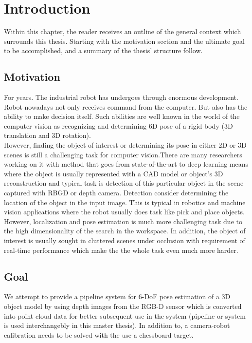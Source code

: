 \chapter{Introduction}
\label{chap:intro}

Within this chapter, the reader receives an outline of the general context which surrounds this thesis. Starting with the motivation section and the ultimate goal to be accomplished, and a summary of the thesis' structure follow. 

\section{Motivation}
For years. The industrial robot has undergoes through enormous development. Robot nowadays not only receives command from the computer. But also has the ability to make decision itself. Such abilities are well known in the world of the computer vision as recognizing and determining 6D pose of a rigid body (3D translation and 3D rotation). \\
However, finding the object of interest or determining its pose in either 2D or 3D scenes is still a challenging task for computer vision.There are many researchers working on it with method that goes from state-of-the-art to deep learning means where the object is usually represented with a CAD model or object's 3D reconstruction and typical task is detection of this particular object in the scene captured with RBGD or depth camera. Detection consider determining the location of the object in the input image. This is typical in robotics and machine vision applications where the robot usually does task like pick and place objects. However, localization and pose estimation is much more challenging task due to the high dimensionality of the search in the workspace. In addition, the object of interest is usually sought in cluttered scenes under occlusion with requirement of real-time performance which make the the whole task even much more harder.

\section{Goal}
\iffalse
We attempt to provide a pipeline system for 6-DoF pose estimation of a 3D object model by using depth images from the RGB-D sensor which is converted into point cloud data for better subsequent use in the system (pipeline or system is used interchangebly in this master thesis). In addition to, a camera-robot calibration needs to be solved with the use a chessboard target.

